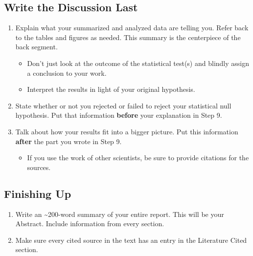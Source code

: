 \documentclass[
]{book}
\providecommand{\tightlist}{%
  \setlength{\itemsep}{0pt}\setlength{\parskip}{0pt}}
\begin{document}
\hypertarget{write-the-discussion-last}{%
\subsection*{Write the Discussion Last}\label{write-the-discussion-last}}

\begin{enumerate}
\def\labelenumi{\arabic{enumi}.}
\setcounter{enumi}{8}
\item
  Explain what your summarized and analyzed data are telling you. Refer back to the tables and figures as needed. This summary is the centerpiece of the back segment.

  \begin{itemize}
  \tightlist
  \item
    Don't just look at the outcome of the statistical test(s) and blindly assign a conclusion to your work.
  \item
    Interpret the results in light of your original hypothesis.
  \end{itemize}
\item
  State whether or not you rejected or failed to reject your statistical null hypothesis. Put that information \textbf{before} your explanation in Step 9.
\item
  Talk about how your results fit into a bigger picture. Put this information \textbf{after} the part you wrote in Step 9.

  \begin{itemize}
  \tightlist
  \item
    If you use the work of other scientists, be sure to provide citations for the sources.
  \end{itemize}
\end{enumerate}

\hypertarget{finishing-up-1}{%
\subsection*{Finishing Up}\label{finishing-up-1}}

\begin{enumerate}
\def\labelenumi{\arabic{enumi}.}
\setcounter{enumi}{11}
\item
  Write an \textasciitilde200-word summary of your entire report. This will be your Abstract. Include information from every section.
\item
  Make sure every cited source in the text has an entry in the Literature Cited section.
\end{enumerate}
\end{document}
